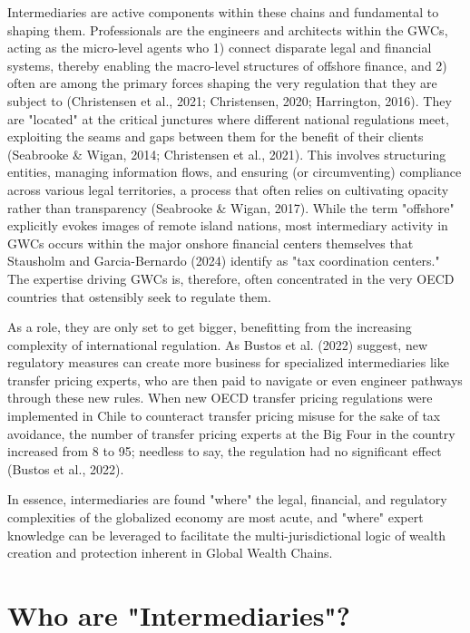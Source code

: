 Intermediaries are active components within these chains and fundamental to shaping them. Professionals are the engineers and architects within the GWCs, acting as the micro-level agents who 1) connect disparate legal and financial systems, thereby enabling the macro-level structures of offshore finance, and 2) often are among the primary forces shaping the very regulation that they are subject to (Christensen et al., 2021; Christensen, 2020; Harrington, 2016). They are "located" at the critical junctures where different national regulations meet, exploiting the seams and gaps between them for the benefit of their clients (Seabrooke \& Wigan, 2014; Christensen et al., 2021). This involves structuring entities, managing information flows, and ensuring (or circumventing) compliance across various legal territories, a process that often relies on cultivating opacity rather than transparency (Seabrooke \& Wigan, 2017). While the term "offshore" explicitly evokes images of remote island nations, most intermediary activity in GWCs occurs within the major onshore financial centers themselves that Stausholm and Garcia-Bernardo (2024) identify as "tax coordination centers." The expertise driving GWCs is, therefore, often concentrated in the very OECD countries that ostensibly seek to regulate them. 

As a role, they are only set to get bigger, benefitting from the increasing complexity of international regulation. As Bustos et al. (2022) suggest, new regulatory measures can create more business for specialized intermediaries like transfer pricing experts, who are then paid to navigate or even engineer pathways through these new rules. When new OECD transfer pricing regulations were implemented in Chile to counteract transfer pricing misuse for the sake of tax avoidance, the number of transfer pricing experts at the Big Four in the country increased from 8 to 95; needless to say, the regulation had no significant effect (Bustos et al., 2022).

In essence, intermediaries are found "where" the legal, financial, and regulatory complexities of the globalized economy are most acute, and "where" expert knowledge can be leveraged to facilitate the multi-jurisdictional logic of wealth creation and protection inherent in Global Wealth Chains.

\section{Who are "Intermediaries"?} 


